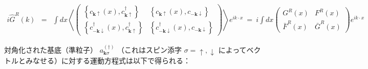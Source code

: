 \documentclass[uplatex,a4j,12pt,dvipdfmx]{jsarticle}
\begin{document}
\begin{eqnarray}
	i
	\hat{G}^{R}(k)
	&=&
	\int \! dx
	\left\langle
	\left(
	\begin{array}{cc}
			\left\{ c_{\bm{k}\uparrow}(x), c_{\bm{k}\uparrow}^{\dagger} \right\}              & \left\{ c_{\bm{k}\uparrow}(x), c_{-\bm{k}\downarrow} \right\}
			\\[3mm]
			\left\{ c_{-\bm{k}\downarrow}^{\dagger}(x), c_{\bm{k}\uparrow}^{\dagger} \right\} & \left\{ c_{-\bm{k}\downarrow}^{\dagger}(x), c_{-\bm{k}\downarrow} \right\}
		\end{array}
	\right)
	\right\rangle
	e^{ i k \cdot x }
	\ = \
	i
	\int \! dx
	\left(
	\begin{array}{cc}
			G^{R}(x)       & F^{R}(x)
			\\[3mm]
			\bar{F}^{R}(x) & \bar{G}^{R}(x)
		\end{array}
	\right)
	e^{ i k \cdot x }
\end{eqnarray}
%

対角化された基底（準粒子） $a_{\bm{k} \sigma}^{(\dagger)}$
（これはスピン添字 $\sigma=\uparrow,\downarrow$ によってベクトルとみなせる）に対する運動方程式は以下で得られる：
\end{document}
